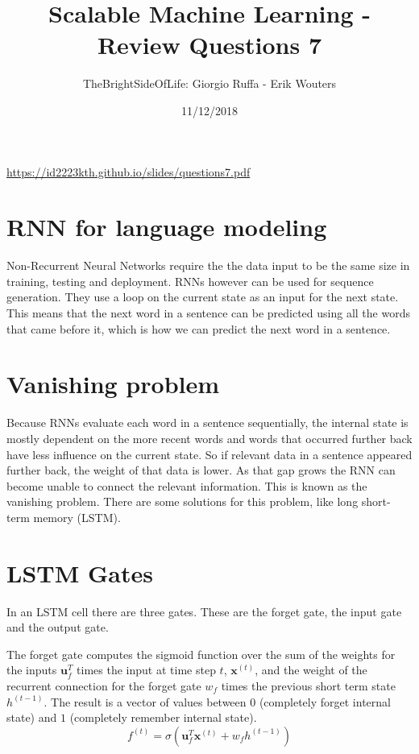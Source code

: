\documentclass[a4paper]{article}
\title{Scalable Machine Learning - Review Questions 7}
\author{TheBrightSideOfLife: Giorgio Ruffa - Erik Wouters}
\date{11/12/2018}
\begin{document}
\maketitle

\url{https://id2223kth.github.io/slides/questions7.pdf}

\section{RNN for language modeling} %

Non-Recurrent Neural Networks require the the data input to be the same size in training, testing and deployment. RNNs however can be used for sequence generation. They use a loop on the current state as an input for the next state. This means that the next word in a sentence can be predicted using all the words that came before it, which is how we can predict the next word in a sentence.

\section{Vanishing problem} %
Because RNNs evaluate each word in a sentence sequentially, the internal state is mostly dependent on the more recent words and words that occurred further back have less influence on the current state. So if relevant data in a sentence appeared further back, the weight of that data is lower. As that gap grows the RNN can become unable to connect the relevant information. This is known as the vanishing problem. There are some solutions for this problem, like long short-term memory (LSTM).


\section{LSTM Gates} %
In an LSTM cell there are three gates. These are the forget gate, the input gate and the output gate.

The forget gate computes the sigmoid function over the sum of the weights for the inputs $\mathbf{u}^T_f$ times the input at time step $t$, $\mathbf{x}^{(t)}$, and the weight of the recurrent connection for the forget gate $w_f$ times the previous short term state $h^{(t-1)}$. The result is a vector of values between $0$ (completely forget internal state) and $1$ (completely remember internal state).
\begin{equation}
    f^{(t)} = \sigma(\mathbf{u}^T_f\mathbf{x}^{(t)}+w_fh^{(t-1)})
\end{equation}
\end{document}
